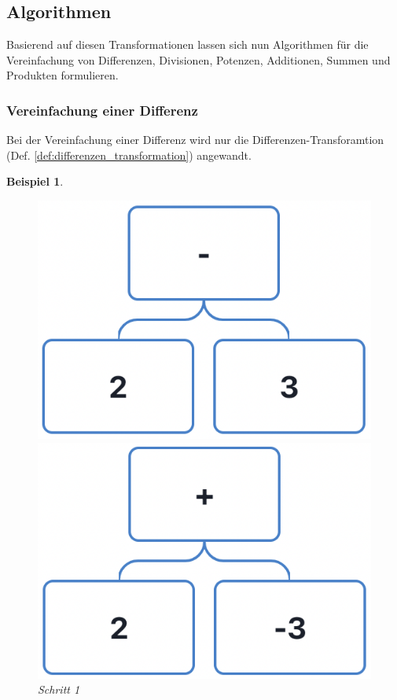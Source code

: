 \documentclass[11pt]{article}
\newcommand{\lab}[1]{(Def. \ref{#1})}
\newtheorem{example}{Beispiel}
\begin{document}
\subsection{Algorithmen}

Basierend auf diesen Transformationen lassen sich nun Algorithmen für die Vereinfachung von
Differenzen, Divisionen, Potenzen, Additionen, Summen und Produkten formulieren.

\subsubsection{Vereinfachung einer Differenz}
Bei der Vereinfachung einer Differenz wird nur die Differenzen-Transforamtion \lab{def:differenzen_transformation}
angewandt.

\begin{example}
  \begin{figure}[h]
    \begin{minipage}{.5\textwidth}
      \centering
      \includegraphics[scale=0.4]{trees/difference/beispiel_1_1.png}
      \caption{Schritt 1}
    \end{minipage}
    \begin{minipage}{.5\textwidth}
      \centering
      \includegraphics[scale=0.4]{trees/difference/beispiel_1_2.png}

\end{minipage}
\end{figure}
\end{example}
\end{document}

